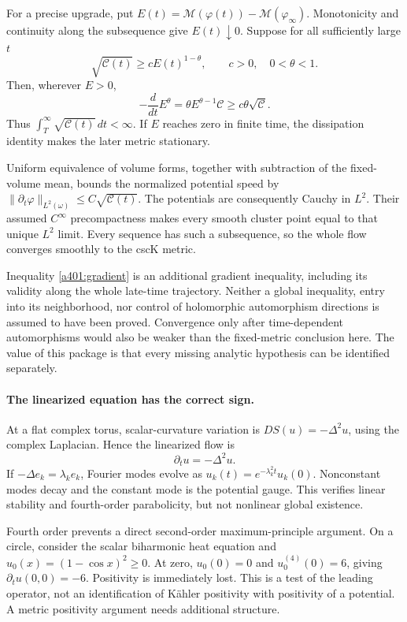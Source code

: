 \documentclass[11pt]{article}
\begin{document}
For a precise upgrade, put
$E(t)=\mathcal M(\varphi(t))-\mathcal M(\varphi_\infty)$.
Monotonicity and continuity along the subsequence give
$E(t)\downarrow0$. Suppose for all sufficiently large $t$
\begin{equation}\label{a401:gradient}
 \sqrt{\mathcal C(t)}\geq cE(t)^{1-\theta},
                 \qquad c>0,\quad0<\theta<1.
\end{equation}
Then, wherever $E>0$,
\[
 -\frac{d}{dt}E^\theta
 =\theta E^{\theta-1}\mathcal C
                      \geq c\theta\sqrt{\mathcal C}.
\]
Thus $\int_T^\infty\sqrt{\mathcal C(t)}\,dt<\infty$.
If $E$ reaches zero in finite time, the dissipation
identity makes the later metric stationary.

Uniform equivalence of volume forms, together
with subtraction of the fixed-volume mean,
bounds the normalized potential speed by
$\|\partial_t\varphi\|_{L^2(\omega)}
 \leq C\sqrt{\mathcal C(t)}$.
The potentials are consequently Cauchy in $L^2$.
Their assumed $C^\infty$ precompactness makes
every smooth cluster point equal to that
unique $L^2$ limit. Every sequence has such
a subsequence, so the whole flow converges
smoothly to the cscK metric.

Inequality \eqref{a401:gradient} is an additional
gradient inequality, including its validity
along the whole late-time trajectory. Neither
a global inequality, entry into its neighborhood,
nor control of holomorphic automorphism directions
is assumed to have been proved. Convergence only
after time-dependent automorphisms would also
be weaker than the fixed-metric conclusion here.
The value of this package is that every missing
analytic hypothesis can be identified separately.

\paragraph{The linearized equation has the correct sign.}
At a flat complex torus, scalar-curvature variation
is $DS(u)=-\Delta^2u$, using the complex Laplacian.
Hence the linearized flow is
\[
                         \partial_tu=-\Delta^2u.
\]
If $-\Delta e_k=\lambda_ke_k$, Fourier modes evolve as
$u_k(t)=e^{-\lambda_k^2t}u_k(0)$. Nonconstant modes
decay and the constant mode is the potential gauge.
This verifies linear stability and fourth-order
parabolicity, but not nonlinear global existence.

Fourth order prevents a direct second-order
maximum-principle argument. On a circle, consider
the scalar biharmonic heat equation and
$u_0(x)=(1-\cos x)^2\geq0$. At zero,
$u_0(0)=0$ and $u_0^{(4)}(0)=6$, giving
$\partial_tu(0,0)=-6$. Positivity is immediately
lost. This is a test of the leading operator,
not an identification of Kähler positivity
with positivity of a potential. A metric
positivity argument needs additional structure.
\end{document}

